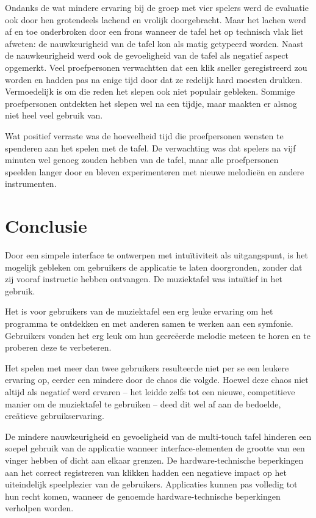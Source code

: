 \documentclass{acm}
\begin{document}
Ondanks de wat mindere ervaring bij de groep met vier spelers werd de evaluatie ook door hen grotendeels lachend en vrolijk doorgebracht. Maar het lachen werd af en toe onderbroken door een frons wanneer de tafel het op technisch vlak liet afweten: de nauwkeurigheid van de tafel kon als matig getypeerd worden. Naast de nauwkeurigheid werd ook de gevoeligheid van de tafel als negatief aspect opgemerkt. Veel proefpersonen verwachtten dat een klik sneller geregistreerd zou worden en hadden pas na enige tijd door dat ze redelijk hard moesten drukken. Vermoedelijk is om die reden het slepen ook niet populair gebleken. Sommige proefpersonen ontdekten het slepen wel na een tijdje, maar maakten er alsnog niet heel veel gebruik van.

Wat positief verraste was de hoeveelheid tijd die proefpersonen wensten te spenderen aan het spelen met de tafel. De verwachting was dat spelers na vijf minuten wel genoeg zouden hebben van de tafel, maar alle proefpersonen speelden langer door en bleven experimenteren met nieuwe melodie\"en en andere instrumenten.

\section{Conclusie}
\label{sec_conclusie}
Door een simpele interface te ontwerpen met intu\"itiviteit als uitgangspunt, is het mogelijk gebleken om gebruikers de applicatie te laten doorgronden, zonder dat zij vooraf instructie hebben ontvangen. De muziektafel was intu\"itief in het gebruik.

Het is voor gebruikers van de muziektafel een erg leuke ervaring om het programma te ontdekken en met anderen samen te werken aan een symfonie. Gebruikers vonden het erg leuk om hun gecre\"eerde melodie meteen te horen en te proberen deze te verbeteren.

Het spelen met meer dan twee gebruikers resulteerde niet per se een leukere ervaring op, eerder een mindere door de chaos die volgde. Hoewel deze chaos niet altijd als negatief werd ervaren -- het leidde zelfs tot een nieuwe, competitieve manier om de muziektafel te gebruiken -- deed dit wel af aan de bedoelde, cre\"atieve gebruikservaring.

De mindere nauwkeurigheid en gevoeligheid van de multi-touch tafel hinderen een soepel gebruik van de applicatie wanneer interface-elementen de grootte van een vinger hebben of dicht aan elkaar grenzen. De hardware-technische beperkingen aan het correct registreren van klikken hadden een negatieve impact op het uiteindelijk speelplezier van de gebruikers. Applicaties kunnen pas volledig tot hun recht komen, wanneer de genoemde hardware-technische beperkingen verholpen worden.
\end{document}

